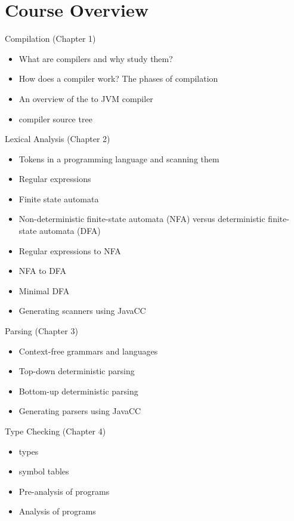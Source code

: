 \documentclass[8pt,a4paper,compress]{beamer}
\begin{document}
\section{Course Overview}

\begin{frame}[fragile]
\pause

Compilation (Chapter 1)
\begin{itemize}
\item What are compilers and why study them?
\item How does a compiler work? The phases of compilation
\item An overview of the \jmm to JVM compiler
\item \jmm compiler source tree
\end{itemize}

\pause
\bigskip

Lexical Analysis (Chapter 2)
\begin{itemize}
\item Tokens in a programming language and scanning them
\item Regular expressions
\item Finite state automata
\item Non-deterministic finite-state automata (NFA) versus deterministic finite-state automata (DFA)
\item Regular expressions to NFA
\item NFA to DFA
\item Minimal DFA
\item Generating scanners using JavaCC
\end{itemize}
\end{frame}

\begin{frame}[fragile]
\pause

Parsing (Chapter 3)
\begin{itemize}
\item Context-free grammars and languages
\item Top-down deterministic parsing
\item Bottom-up deterministic parsing
\item Generating parsers using JavaCC
\end{itemize}

\pause
\bigskip

Type Checking (Chapter 4)
\begin{itemize}
\item \jmm types
\item \jmm symbol tables
\item Pre-analysis of \jmm programs
\item Analysis of \jmm programs
\end{itemize}
\end{frame}
\end{document}
